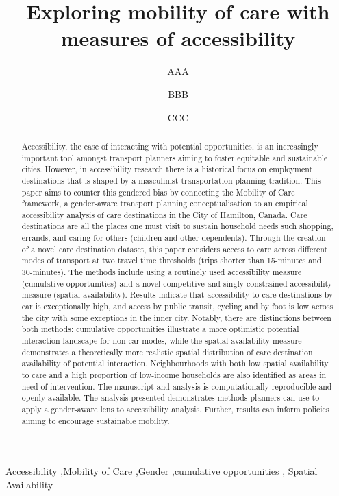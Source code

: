\documentclass[
  authoryear,
  preprint,
  3p]{elsarticle}
\begin{document}
\begin{frontmatter}
\title{Exploring mobility of care with measures of accessibility}
\author[]{AAA%
%
}
\author[]{BBB%
%
}
\author[]{CCC%
%
}





        
\begin{abstract}
Accessibility, the ease of interacting with potential opportunities, is
an increasingly important tool amongst transport planners aiming to
foster equitable and sustainable cities. However, in accessibility
research there is a historical focus on employment destinations that is
shaped by a masculinist transportation planning tradition. This paper
aims to counter this gendered bias by connecting the Mobility of Care
framework, a gender-aware transport planning conceptualisation to an
empirical accessibility analysis of care destinations in the City of
Hamilton, Canada. Care destinations are all the places one must visit to
sustain household needs such shopping, errands, and caring for others
(children and other dependents). Through the creation of a novel care
destination dataset, this paper considers access to care across
different modes of transport at two travel time thresholds (trips
shorter than 15-minutes and 30-minutes). The methods include using a
routinely used accessibility measure (cumulative opportunities) and a
novel competitive and singly-constrained accessibility measure (spatial
availability). Results indicate that accessibility to care destinations
by car is exceptionally high, and access by public transit, cycling and
by foot is low across the city with some exceptions in the inner city.
Notably, there are distinctions between both methods: cumulative
opportunities illustrate a more optimistic potential interaction
landscape for non-car modes, while the spatial availability measure
demonstrates a theoretically more realistic spatial distribution of care
destination availability of potential interaction. Neighbourhoods with
both low spatial availability to care and a high proportion of
low-income households are also identified as areas in need of
intervention. The manuscript and analysis is computationally
reproducible and openly available. The analysis presented demonstrates
methods planners can use to apply a gender-aware lens to accessibility
analysis. Further, results can inform policies aiming to encourage
sustainable mobility.
\end{abstract}





\begin{keyword}
    Accessibility \sep Mobility of Care \sep Gender \sep cumulative
opportunities \sep 
    Spatial Availability
\end{keyword}
\end{frontmatter}
    
\end{document}
